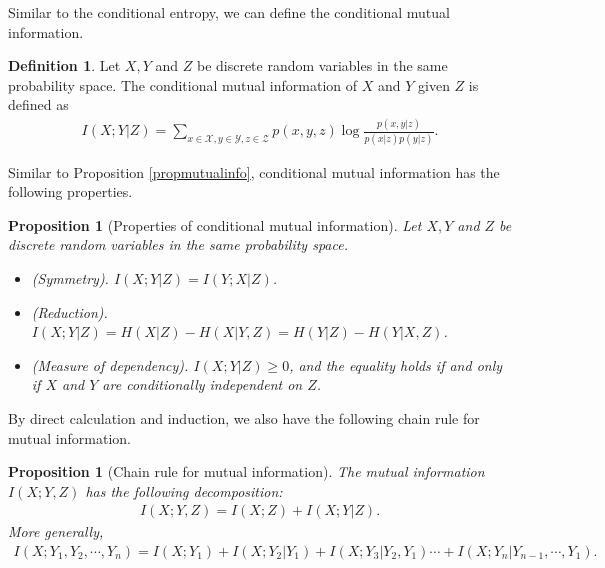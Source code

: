 \documentclass{article}
\numberwithin{equation}{section}
\renewcommand{\cal}{\mathcal}
\theoremstyle{plain}
\newtheorem{proposition}[theorem]{Proposition}
\theoremstyle{definition}
\newtheorem{definition}[theorem]{Definition}
\begin{document}
Similar to the conditional entropy, we can define the conditional mutual information.
\begin{definition}\label{condmutualinfodef}
Let $X,Y$ and $Z$ be discrete random variables in the same probability space. The conditional mutual information of $X$ and $Y$ given $Z$ is defined as
\begin{align*}
	I(X;Y|Z)=\sum_{x\in\cal{X},y\in\cal{Y},z\in\cal{Z}}p(x,y,z)\log\frac{p(x,y|z)}{p(x|z)p(y|z)}.
\end{align*}
\end{definition}
Similar to Proposition \ref{propmutualinfo}, conditional mutual information has the following properties.
\begin{proposition}[Properties of conditional mutual information]
	Let $X,Y$ and $Z$ be discrete random variables in the same probability space.
	\begin{itemize}
		\item[(i)] (Symmetry). $I(X;Y|Z)=I(Y;X|Z)$.
		\item[(ii)] (Reduction). $I(X;Y|Z)=H(X|Z)-H(X|Y,Z)=H(Y|Z)-H(Y|X,Z)$.
		\item[(iii)] (Measure of dependency). $I(X;Y|Z)\geq 0$, and the equality holds if and only if $X$ and $Y$ are conditionally independent on $Z$.
	\end{itemize}
\end{proposition}

By direct calculation and induction, we also have the following chain rule for mutual information.

\begin{proposition}[Chain rule for mutual information]
The mutual information $I(X;Y,Z)$ has the following decomposition:
\begin{align*}
	I(X;Y,Z)=I(X;Z)+I(X;Y|Z).
\end{align*}
More generally,
\begin{align*}
	I(X;Y_1,Y_2,\cdots,Y_n)=I(X;Y_1)+I(X;Y_2|Y_1)+I(X;Y_3|Y_2,Y_1)\cdots+I(X;Y_n|Y_{n-1},\cdots,Y_1).
\end{align*}
\end{proposition}
\end{document}

